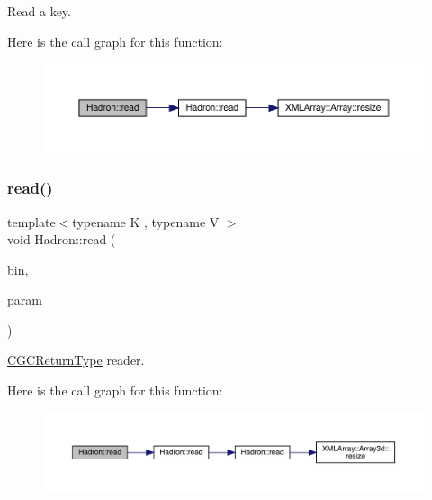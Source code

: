 Read a key. 

Here is the call graph for this function\+:\nopagebreak
\begin{figure}[H]
\begin{center}
\leavevmode
\includegraphics[width=350pt]{d1/daf/namespaceHadron_a0651834c5f37836ea0e1e081b4214546_cgraph}
\end{center}
\end{figure}
\mbox{\label{namespaceHadron_a28b215f1b16c66c9862495bf8c11084f}} 
\subsubsection{\texorpdfstring{read()}{read()}\hspace{0.1cm}{\footnotesize\ttfamily [28/94]}}
{\footnotesize\ttfamily template$<$typename K , typename V $>$ \\
void Hadron\+::read (\begin{DoxyParamCaption}\item[{\mbox{\hyperlink{classADATIO_1_1BinaryReader}{Binary\+Reader}} \&}]{bin,  }\item[{\mbox{\hyperlink{structHadron_1_1CGCReturnType}{C\+G\+C\+Return\+Type}}$<$ K, V $>$ \&}]{param }\end{DoxyParamCaption})\hspace{0.3cm}{\ttfamily [inline]}}



\mbox{\hyperlink{structHadron_1_1CGCReturnType}{C\+G\+C\+Return\+Type}} reader. 

Here is the call graph for this function\+:\nopagebreak
\begin{figure}[H]
\begin{center}
\leavevmode
\includegraphics[width=350pt]{d1/daf/namespaceHadron_a28b215f1b16c66c9862495bf8c11084f_cgraph}
\end{center}
\end{figure}
\mbox{\label{namespaceHadron_ac70286e9fd2f4a9ddf81f9235d1812e8}} 
